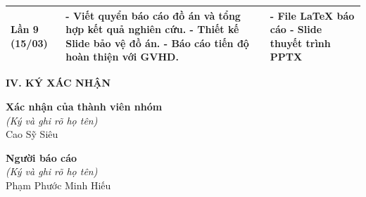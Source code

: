 \documentclass[12pt,a4paper]{report}
\begin{document}
\begin{center}
\begin{longtable}{|>{\centering\arraybackslash}p{2.5cm}|p{6.5cm}|p{5cm}|}
		Lần 9 \newline (15/03)  & 
		- Viết quyển báo cáo đồ án và tổng hợp kết quả nghiên cứu. \newline
		- Thiết kế Slide bảo vệ đồ án. \newline
		- Báo cáo tiến độ hoàn thiện với GVHD. & 
		- File LaTeX báo cáo \newline
		- Slide thuyết trình PPTX \\
		\hline
	\end{longtable}
\end{center}

\textbf{IV. KÝ XÁC NHẬN}
\vspace{0.5cm}

\noindent
\begin{minipage}{0.5\textwidth}
	\centering
	\textbf{Xác nhận của thành viên nhóm} \\
	\textit{(Ký và ghi rõ họ tên)} \\
	\vspace{2cm}
	Cao Sỹ Siêu
\end{minipage}%
\begin{minipage}{0.5\textwidth}
	\centering
	\textbf{Người báo cáo} \\
	\textit{(Ký và ghi rõ họ tên)} \\
	\vspace{2cm}
	Phạm Phước Minh Hiếu
\end{minipage}
\end{document}
